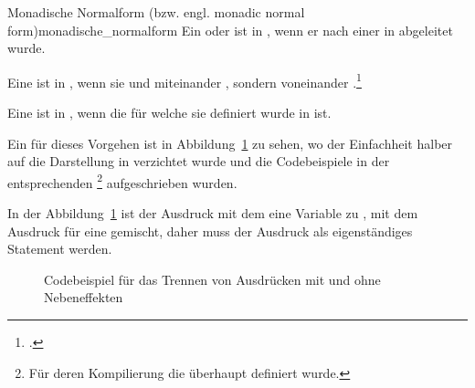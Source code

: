 \begin{Definition}{Monadische Normalform (bzw. engl. monadic normal form)}{monadische_normalform}
  Ein  oder  ist in , wenn er nach einer  in  abgeleitet wurde.

  Eine  ist in , wenn sie  und   miteinander , sondern voneinander .\footcite{g_siek_course_2022}

  Eine  ist in , wenn die  für welche sie definiert wurde in  ist.
\end{Definition}

Ein  für dieses Vorgehen ist in Abbildung~\ref{fig:example_monadic_normal_form} zu sehen, wo der Einfachheit halber auf die Darstellung in  verzichtet wurde und die Codebeispiele in der entsprechenden \footnote{Für deren Kompilierung die  überhaupt definiert wurde.} aufgeschrieben wurden.

In der Abbildung~\ref{fig:example_monadic_normal_form} ist der Ausdruck mit dem  eine Variable zu  , mit dem Ausdruck für eine   gemischt, daher muss der  Ausdruck als eigenständiges Statement  werden.

\begin{figure}[H]
  \hfill

  \caption{Codebeispiel für das Trennen von Ausdrücken mit und ohne Nebeneffekten}
  \label{fig:example_monadic_normal_form}
\end{figure}

